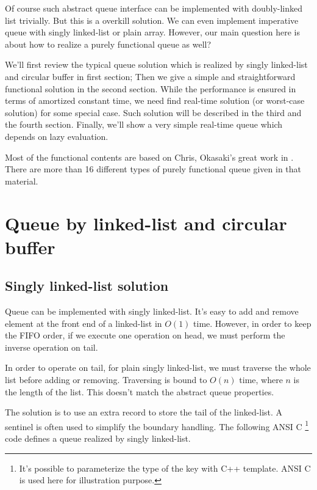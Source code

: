 \documentclass{article}
\begin{document}
Of course such abstract queue interface can be implemented with
doubly-linked list trivially. But this is a overkill solution.
We can even implement imperative queue with singly linked-list or
plain array. However, our main question here is about how to realize
a purely functional queue as well?

We'll first review the typical queue solution which is realized by
singly linked-list and circular buffer in first section; Then we
give a simple and straightforward functional solution in the second
section. While the performance is ensured in terms of amortized
constant time, we need find real-time solution (or worst-case solution)
for some special case. Such solution will be described in the third
and the fourth section. Finally, we'll show a very simple real-time
queue which depends on lazy evaluation.

Most of the functional contents are based on Chris, Okasaki's great
work in \cite{okasaki-book}. There are more than 16 different types
of purely functional queue given in that material.

\section{Queue by linked-list and circular buffer}

\subsection{Singly linked-list solution}

Queue can be implemented with singly linked-list. It's easy to add
and remove element at the front end of a linked-list in $O(1)$ time.
However, in
order to keep the FIFO order, if we execute one operation on head,
we must perform the inverse operation on tail.

In order to operate on tail, for plain singly linked-list, we must traverse the whole list before
adding or removing. Traversing is bound to $O(n)$ time,
where $n$ is the length of the list. This doesn't match the abstract
queue properties.

The solution is to use an extra record to store the tail of the linked-list.
A sentinel is often used to simplify the boundary handling. The
following ANSI C \footnote{It's possible to parameterize the type of the key
with C++ template. ANSI C is used here for illustration purpose.}
code defines a queue realized by singly linked-list.
\end{document}
